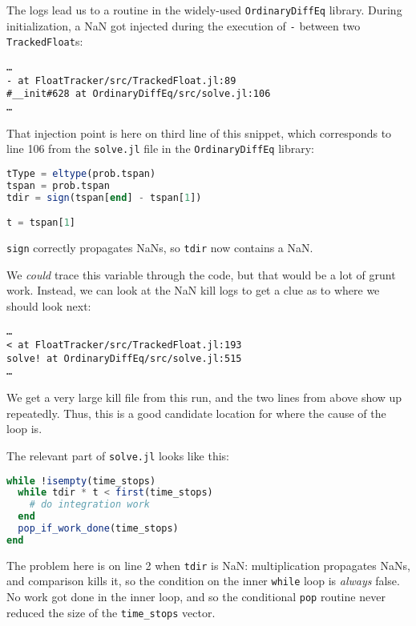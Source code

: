 \documentclass{juliacon}
\begin{document}

The logs lead us to a routine in the widely-used \texttt{OrdinaryDiffEq} library.
During initialization, a NaN got injected during the execution of \texttt{-} between two \texttt{TrackedFloat}s:

\begin{verbatim}
…
- at FloatTracker/src/TrackedFloat.jl:89
#__init#628 at OrdinaryDiffEq/src/solve.jl:106
…
\end{verbatim}

That injection point is here on third line of this snippet, which corresponds to line 106 from the \texttt{solve.jl} file in the \texttt{OrdinaryDiffEq} library:

\begin{lstlisting}[language = Julia]
tType = eltype(prob.tspan)
tspan = prob.tspan
tdir = sign(tspan[end] - tspan[1])

t = tspan[1]
\end{lstlisting}

\texttt{sign} correctly propagates NaNs, so \texttt{tdir} now contains a NaN.

We \emph{could} trace this variable through the code, but that would be a lot of grunt work.
Instead, we can look at the NaN kill logs to get a clue as to where we should look next:

\begin{verbatim}
…
< at FloatTracker/src/TrackedFloat.jl:193
solve! at OrdinaryDiffEq/src/solve.jl:515
…
\end{verbatim}

We get a very large kill file from this run, and the two lines from above show up repeatedly.
Thus, this is a good candidate location for where the cause of the loop is.

The relevant part of \texttt{solve.jl} looks like this:

\begin{lstlisting}[language = Julia]
while !isempty(time_stops)
  while tdir * t < first(time_stops)
    # do integration work
  end
  pop_if_work_done(time_stops)
end
\end{lstlisting}

The problem here is on line 2 when \texttt{tdir} is NaN: multiplication propagates NaNs, and comparison kills it, so the condition on the inner \texttt{while} loop is \emph{always} false.
No work got done in the inner loop, and so the conditional \texttt{pop} routine never reduced the size of the \texttt{time\_stops} vector.
\end{document}
